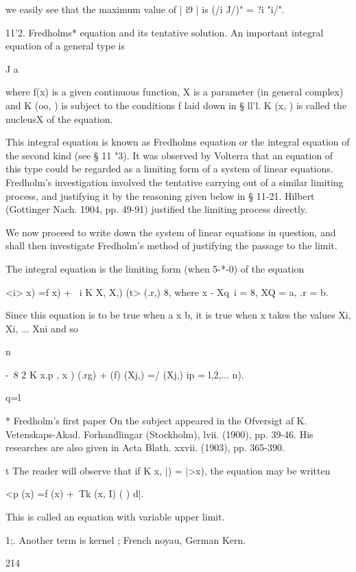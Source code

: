 we easily see that the maximum value of | i9 | is (/i  J/)" = ?i "i/". 

11'2. Fredholms* equation and its tentative solution. 
An important integral equation of a general type is 

J a 

where f(x) is a given continuous function, X is a parameter (in general 
complex) and K (oo,  ) is subject to the conditions f laid down in § ll'l. 
K (x,  ) is called the nucleusX of the equation. 

This integral equation is known as Fredholms equation or the integral 
equation of the second kind (see § 11 "3). It was observed by Volterra that an 
equation of this type could be regarded as a limiting form of a system 
of linear equations. Fredholm's investigation involved the tentative carrying 
out of a similar limiting process, and justifying it by the reasoning given 
below in § 11-21. Hilbert (Gottinger Nach. 1904, pp. 49-91) justified the 
limiting process directly. 

We now proceed to write down the system of linear equations in question, 
and shall then investigate Fredholm's method of justifying the passage to 
the limit. 

The integral equation is the limiting form (when 5-*-0) of the equation 

<i>  x) =f  x) + \ i K  X, X,) (t> (.r,) 8, 
where x - Xq\ i = 8, XQ = a, .r  = b. 

Since this equation is to be true when a  x b, it is true when x takes the values 
Xi, Xi, ... Xni and so 

n 

-\ 8 2 K  x.p , x ) (.rg) + (f) (Xj,) =/ (Xj,) ip = l,2,... n). 

q=l 

* Fredholm's first paper On the subject appeared in the Ofversigt af K. Vetenskaps-Akad. 
Forhandlingar (Stockholm), lvii. (1900), pp. 39-46. His researches are also given in Acta Blath. 
xxvii. (1903), pp. 365-390. 

t The reader will observe that if K  x, |) =  |>x), the equation may be written 

<p (x) =f (x) +\ Tk (x, I) ( ) d|. 



This is called an equation with variable upper limit. 

1;. Another term is kernel ; French noyau, German Kern. 



214 



